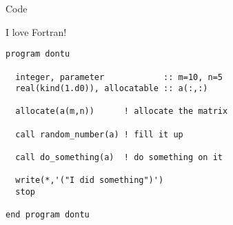 \documentclass{beamer}
\begin{document}
\begin{frame}[fragile]{Code}

  I love Fortran!
  
  \vspace{0.5cm}

\begin{lstlisting}[basicstyle=\tt\scriptsize, showlines=true]
program dontu

  integer, parameter            :: m=10, n=5
  real(kind(1.d0)), allocatable :: a(:,:)

  allocate(a(m,n))      ! allocate the matrix

  call random_number(a) ! fill it up

  call do_something(a)  ! do something on it

  write(*,'("I did something")')
  stop

end program dontu
\end{lstlisting}

\end{frame}
\end{document}

